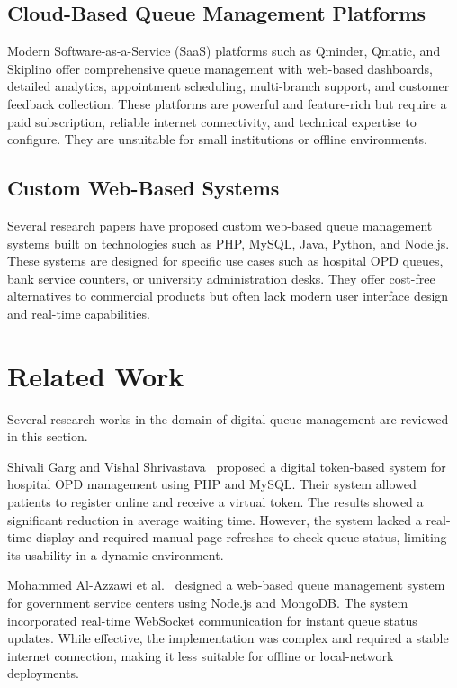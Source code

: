 \subsection{Cloud-Based Queue Management Platforms}

Modern Software-as-a-Service (SaaS) platforms such as Qminder, Qmatic, and Skiplino offer comprehensive queue management with web-based dashboards, detailed analytics, appointment scheduling, multi-branch support, and customer feedback collection. These platforms are powerful and feature-rich but require a paid subscription, reliable internet connectivity, and technical expertise to configure. They are unsuitable for small institutions or offline environments.

\subsection{Custom Web-Based Systems}

Several research papers have proposed custom web-based queue management systems built on technologies such as PHP, MySQL, Java, Python, and Node.js. These systems are designed for specific use cases such as hospital OPD queues, bank service counters, or university administration desks. They offer cost-free alternatives to commercial products but often lack modern user interface design and real-time capabilities.

\section{Related Work}

Several research works in the domain of digital queue management are reviewed in this section.

Shivali Garg and Vishal Shrivastava~\cite{garg2019} proposed a digital token-based system for hospital OPD management using PHP and MySQL. Their system allowed patients to register online and receive a virtual token. The results showed a significant reduction in average waiting time. However, the system lacked a real-time display and required manual page refreshes to check queue status, limiting its usability in a dynamic environment.

Mohammed Al-Azzawi et al.~\cite{alazzawi2020} designed a web-based queue management system for government service centers using Node.js and MongoDB. The system incorporated real-time WebSocket communication for instant queue status updates. While effective, the implementation was complex and required a stable internet connection, making it less suitable for offline or local-network deployments.

